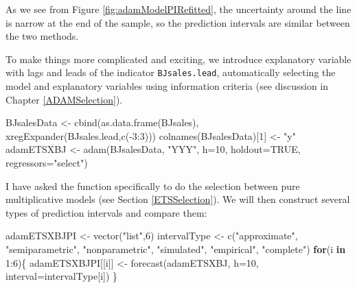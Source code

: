 \documentclass[
]{book}
\newenvironment{Shaded}{\begin{snugshade}}{\end{snugshade}}
\newcommand{\AttributeTok}[1]{\textcolor[rgb]{0.77,0.63,0.00}{#1}}
\newcommand{\ConstantTok}[1]{\textcolor[rgb]{0.00,0.00,0.00}{#1}}
\newcommand{\ControlFlowTok}[1]{\textcolor[rgb]{0.13,0.29,0.53}{\textbf{#1}}}
\newcommand{\DecValTok}[1]{\textcolor[rgb]{0.00,0.00,0.81}{#1}}
\newcommand{\FunctionTok}[1]{\textcolor[rgb]{0.00,0.00,0.00}{#1}}
\newcommand{\NormalTok}[1]{#1}
\newcommand{\OtherTok}[1]{\textcolor[rgb]{0.56,0.35,0.01}{#1}}
\newcommand{\SpecialCharTok}[1]{\textcolor[rgb]{0.00,0.00,0.00}{#1}}
\newcommand{\StringTok}[1]{\textcolor[rgb]{0.31,0.60,0.02}{#1}}
\theoremstyle{definition}
\theoremstyle{definition}
\theoremstyle{definition}
\theoremstyle{definition}
\theoremstyle{remark}
\begin{document}
As we see from Figure \ref{fig:adamModelPIRefitted}, the uncertainty around the line is narrow at the end of the sample, so the prediction intervals are similar between the two methods.

To make things more complicated and exciting, we introduce explanatory variable with lags and leads of the indicator \texttt{BJsales.lead}, automatically selecting the model and explanatory variables using information criteria (see discussion in Chapter \ref{ADAMSelection}).

\begin{Shaded}
\begin{Highlighting}[]
\NormalTok{BJsalesData }\OtherTok{\textless{}{-}} \FunctionTok{cbind}\NormalTok{(}\FunctionTok{as.data.frame}\NormalTok{(BJsales),}
                     \FunctionTok{xregExpander}\NormalTok{(BJsales.lead,}\FunctionTok{c}\NormalTok{(}\SpecialCharTok{{-}}\DecValTok{3}\SpecialCharTok{:}\DecValTok{3}\NormalTok{)))}
\FunctionTok{colnames}\NormalTok{(BJsalesData)[}\DecValTok{1}\NormalTok{] }\OtherTok{\textless{}{-}} \StringTok{"y"}
\NormalTok{adamETSXBJ }\OtherTok{\textless{}{-}} \FunctionTok{adam}\NormalTok{(BJsalesData, }\StringTok{"YYY"}\NormalTok{,}
                   \AttributeTok{h=}\DecValTok{10}\NormalTok{, }\AttributeTok{holdout=}\ConstantTok{TRUE}\NormalTok{,}
                   \AttributeTok{regressors=}\StringTok{"select"}\NormalTok{)}
\end{Highlighting}
\end{Shaded}

I have asked the function specifically to do the selection between pure multiplicative models (see Section \ref{ETSSelection}). We will then construct several types of prediction intervals and compare them:

\begin{Shaded}
\begin{Highlighting}[]
\NormalTok{adamETSXBJPI }\OtherTok{\textless{}{-}} \FunctionTok{vector}\NormalTok{(}\StringTok{"list"}\NormalTok{,}\DecValTok{6}\NormalTok{)}
\NormalTok{intervalType }\OtherTok{\textless{}{-}} \FunctionTok{c}\NormalTok{(}\StringTok{"approximate"}\NormalTok{, }\StringTok{"semiparametric"}\NormalTok{,}
                  \StringTok{"nonparametric"}\NormalTok{, }\StringTok{"simulated"}\NormalTok{,}
                  \StringTok{"empirical"}\NormalTok{, }\StringTok{"complete"}\NormalTok{)}
\ControlFlowTok{for}\NormalTok{(i }\ControlFlowTok{in} \DecValTok{1}\SpecialCharTok{:}\DecValTok{6}\NormalTok{)\{}
\NormalTok{  adamETSXBJPI[[i]] }\OtherTok{\textless{}{-}} \FunctionTok{forecast}\NormalTok{(adamETSXBJ, }\AttributeTok{h=}\DecValTok{10}\NormalTok{,}
                                \AttributeTok{interval=}\NormalTok{intervalType[i])}
\NormalTok{\}}
\end{Highlighting}
\end{Shaded}
\end{document}
